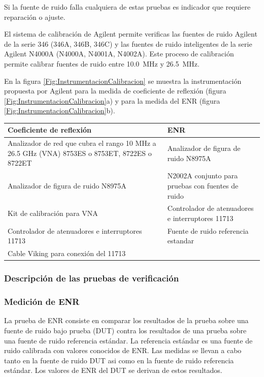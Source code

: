 Si la fuente de ruido falla cualquiera de estas pruebas es indicador que requiere reparación o ajuste.

El sistema de calibración de Agilent permite verificas las fuentes de ruido Agilent de la serie 346 (346A, 346B, 346C) y las fuentes de ruido inteligentes de la serie Agilent N4000A (N4000A, N4001A, N4002A). Este proceso de calibración permite calibrar fuentes de ruido entre \SI{10.0}{\mega\hertz} y \SI{26.5}{\mega\hertz}. 

En la figura \ref{Fig:InstrumentacionCalibracion} se muestra la instrumentación propuesta por Agilent \cite{AGI03} para la medida de coeficiente de reflexión (figura \ref{Fig:InstrumentacionCalibracion}a) y para la medida del ENR (figura \ref{Fig:InstrumentacionCalibracion}b).	

\begin{table}
	\centering
	\begin{tabular}{m{6cm}m{6cm}}
		\toprule
		\textbf{Coeficiente de reflexión} 	&	\textbf{ENR}	\\
		\midrule
		Analizador de red que cubra el rango 10 \si{\mega\hertz} a 26.5 \si{\giga\hertz} (VNA) 8753ES o 8753ET, 8722ES o 8722ET 	&	Analizador de figura de ruido N8975A \\
		\midrule
		Analizador de figura de ruido N8975A	&	N2002A conjunto para pruebas con fuentes de ruido \\
		\midrule		
		Kit de calibración para VNA			&	Controlador de atenuadores e interruptores 11713 \\
		\midrule		
		Controlador de atenuadores e interruptores 11713	& 	Fuente de ruido referencia estandar \\
		\midrule		
		Cable Viking para conexión del 11713	&	\\
		\bottomrule		
	\end{tabular}
\end{table}

\subsubsection{Descripción de las pruebas de verificación}
\subsubsection{Medición de ENR}
La prueba de ENR consiste en comparar los resultados de la prueba sobre una fuente de ruido bajo prueba (DUT) contra los	resultados de una prueba sobre una fuente de ruido referencia estándar. La referencia estándar es una fuente de ruido calibrada con valores conocidos de ENR. Las medidas se llevan a cabo tanto en la fuente de ruido DUT asi como en la fuente de ruido referencia estándar. Los valores de ENR del DUT se derivan de estos resultados. 


